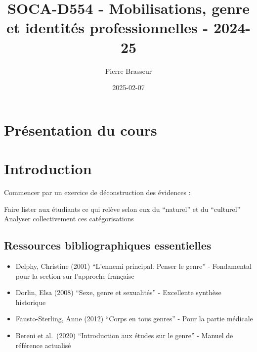 \documentclass[
  letterpaper,
  DIV=11,
  numbers=noendperiod]{scrreprt}
\title{SOCA-D554 - Mobilisations, genre et identités professionnelles -
2024- 25}
\author{Pierre Brasseur}
\date{2025-02-07}
\providecommand{\tightlist}{%
  \setlength{\itemsep}{0pt}\setlength{\parskip}{0pt}}\usepackage{longtable,booktabs,array}
\renewcommand*\contentsname{Table of contents}
\newcommand\contentsname{Table of contents}
\begin{document}
\maketitle

\renewcommand*\contentsname{Table of contents}
{
\hypersetup{linkcolor=}
\setcounter{tocdepth}{2}
\tableofcontents
}


\chapter*{Présentation du cours}\label{pruxe9sentation-du-cours}



\chapter*{}\label{section}

\markboth{}{}


\chapter{Introduction}\label{introduction}

Commencer par un exercice de déconstruction des évidences :

Faire lister aux étudiants ce qui relève selon eux du ``naturel'' et du
``culturel'' Analyser collectivement ces catégorisations

\section{Ressources bibliographiques
essentielles}\label{ressources-bibliographiques-essentielles}

\begin{itemize}
\tightlist
\item
  Delphy, Christine (2001) ``L'ennemi principal. Penser le genre'' -
  Fondamental pour la section sur l'approche française
\item
  Dorlin, Elsa (2008) ``Sexe, genre et sexualités'' - Excellente
  synthèse historique
\item
  Fausto-Sterling, Anne (2012) ``Corps en tous genres'' - Pour la partie
  médicale
\item
  Bereni et al.~(2020) ``Introduction aux études sur le genre'' - Manuel
  de référence actualisé
\end{itemize}
\end{document}
